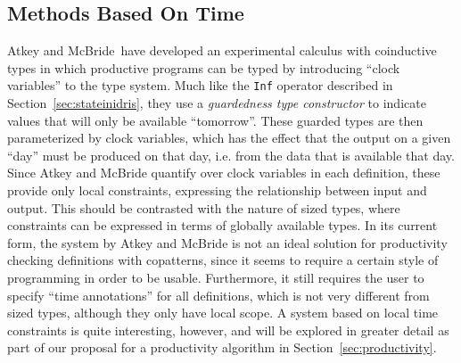 \subsection{Methods Based On Time}
Atkey and McBride\,\citep{AtkeyMcBride13} have developed an experimental calculus with coinductive types in which productive programs can be typed by introducing ``clock variables'' to the type system. Much like the \texttt{Inf} operator described in Section~\ref{sec:stateinidris}, they use a \emph{guardedness type constructor} to indicate values that will only be available ``tomorrow''. These guarded types are then parameterized by clock variables, which has the effect that the output on a given ``day'' must be produced on that day, i.e. from the data that is available that day. Since Atkey and McBride quantify over clock variables in each definition, these provide only local constraints, expressing the relationship between input and output. This should be contrasted with the nature of sized types, where constraints can be expressed in terms of globally available types. In its current form, the system by Atkey and McBride is not an ideal solution for productivity checking definitions with copatterns, since it seems to require a certain style of programming in order to be usable. Furthermore, it still requires the user to specify ``time annotations'' for all definitions, which is not very different from sized types, although they only have local scope. A system based on local time constraints is quite interesting, however, and will be explored in greater detail as part of our proposal for a productivity algorithm in Section~\ref{sec:productivity}.


